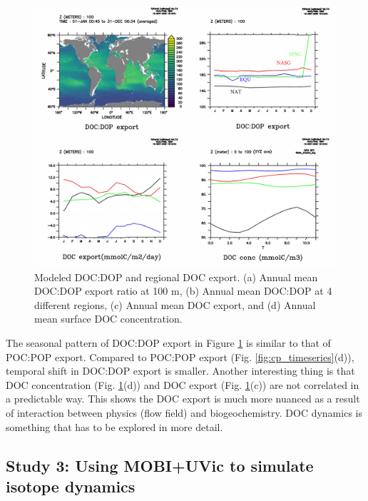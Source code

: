 \documentclass[a4paper]{article}
\begin{document}
\begin{enumerate}
\begin{figure}[h!]   %
   \centering
   \includegraphics[scale=0.6]{doc_regional.pdf}
   \caption[]{Modeled DOC:DOP and regional DOC export. (a) Annual mean DOC:DOP export ratio at 100 m, (b) Annual mean DOC:DOP at 4 different regions, (c) Annual mean DOC export, and (d) Annual mean surface DOC concentration.}
   \label{fig:doc_regional}
\end{figure}

The seasonal pattern of DOC:DOP export in Figure \ref{fig:doc_regional} is similar to that of POC:POP export. Compared to POC:POP export (Fig. \ref{fig:cp_timeseries}(d)), temporal shift in DOC:DOP export is smaller. Another interesting thing is that DOC concentration (Fig. \ref{fig:doc_regional}(d)) and DOC export (Fig. \ref{fig:doc_regional}(c)) are not correlated in a predictable way. This shows the DOC export is much more nuanced as a result of interaction between physics (flow field) and biogeochemistry. DOC dynamics is something that has to be explored in more detail.

\end{enumerate}


\subsection{Study 3: Using MOBI+UVic to simulate isotope dynamics} 
\end{document}
